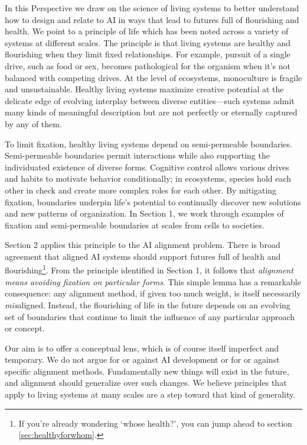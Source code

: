 \documentclass[11pt]{article}
\begin{document}
In this Perspective we draw on the science of living systems to better understand how to design and relate to AI in ways that lead to futures full of flourishing and health. We point to a principle of life which has been noted across a variety of systems at different scales. The principle is that living systems are healthy and flourishing when they limit fixed relationships. For example, pursuit of a single drive, such as food or sex, becomes pathological for the organism when it's not balanced with competing drives. At the level of ecosystems, monoculture is fragile and unsustainable. Healthy living systems maximize creative potential at the delicate edge of evolving interplay between diverse entities---such systems admit many kinds of meaningful description but are not perfectly or eternally captured by any of them. 

To limit fixation, healthy living systems depend on semi-permeable boundaries. Semi-permeable boundaries permit interactions while also supporting the individuated existence of diverse forms. Cognitive control allows various drives and habits to motivate behavior conditionally; in ecosystems, species hold each other in check and create more complex roles for each other. By mitigating fixation, boundaries underpin life's potential to continually discover new solutions and new patterns of organization. In Section 1, we work through examples of fixation and semi-permeable boundaries at scales from cells to societies.

Section 2 applies this principle to the AI alignment problem. There is broad agreement that aligned AI systems should support futures full of health and flourishing\footnote{If you're already wondering `whose health?', you can jump ahead to section \ref{sec:healthyforwhom}.}. From the principle identified in Section 1, it follows that \textit{alignment means avoiding fixation on particular forms}. This simple lemma has a remarkable consequence: any alignment method, if given too much weight, is itself necessarily \textit{mis}aligned. Instead, the flourishing of life in the future depends on an evolving set of boundaries that continue to limit the influence of any particular approach or concept.

Our aim is to offer a conceptual lens, which is of course itself imperfect and temporary. We do not argue for or against AI development or for or against specific alignment methods. Fundamentally new things will exist in the future, and alignment should generalize over such changes. We believe principles that apply to living systems at many scales are a step toward that kind of generality.
\end{document}
